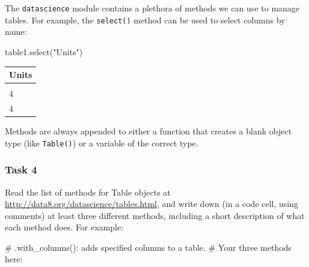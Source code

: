 \documentclass[
  11pt,
]{article}
\newenvironment{Shaded}{\begin{snugshade}}{\end{snugshade}}
\newcommand{\CommentTok}[1]{\textcolor[rgb]{0.37,0.37,0.37}{#1}}
\newcommand{\NormalTok}[1]{\textcolor[rgb]{0.00,0.23,0.31}{#1}}
\newcommand{\StringTok}[1]{\textcolor[rgb]{0.13,0.47,0.30}{#1}}
\begin{document}
The \texttt{datascience} module contains a plethora of methods we can
use to manage tables. For example, the \texttt{select()} method can be
used to select columns by name:

\begin{Shaded}
\begin{Highlighting}[]
\NormalTok{table1.select(}\StringTok{"Units"}\NormalTok{)}
\end{Highlighting}
\end{Shaded}

\begin{longtable}[]{@{}l@{}}
\toprule\noalign{}
Units \\
\midrule\noalign{}
\endhead
\bottomrule\noalign{}
\endlastfoot
4 \\
4 \\
4 \\
\end{longtable}

\begin{tcolorbox}[enhanced jigsaw, bottomrule=.15mm, colframe=quarto-callout-note-color-frame, coltitle=black, left=2mm, title=\textcolor{quarto-callout-note-color}{\faInfo}\hspace{0.5em}{Syntax}, opacityback=0, opacitybacktitle=0.6, leftrule=.75mm, breakable, bottomtitle=1mm, toprule=.15mm, rightrule=.15mm, arc=.35mm, titlerule=0mm, colback=white, toptitle=1mm, colbacktitle=quarto-callout-note-color!10!white]

Methods are always appended to either a function that creates a blank
object type (like \texttt{Table()}) or a variable of the correct type.

\end{tcolorbox}

\subsubsection{Task 4}\label{task-4}

Read the list of methods for Table objects at
\url{http://data8.org/datascience/tables.html}, and write down (in a
code cell, using comments) at least three different methods, including a
short description of what each method does. For example:

\begin{Shaded}
\begin{Highlighting}[]
\CommentTok{\# .with\_columns(): adds specified columns to a table.}
\CommentTok{\# Your three methods here:}
\end{Highlighting}
\end{Shaded}
\end{document}
